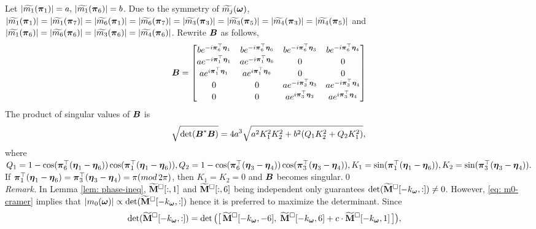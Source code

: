 Let $|\widetilde{m_1}(\boldsymbol{\pi}_1)| = a, \, |\widetilde{m_1}(\boldsymbol{\pi}_6)|=b$. Due to the symmetry of $\widetilde{m_{j}}(\boldsymbol{\omega})$,
$|\widetilde{m_1}(\boldsymbol{\pi}_1)| = |\widetilde{m_1}(\boldsymbol{\pi}_7)| = |\widetilde{m_6}(\boldsymbol{\pi}_1)| = |\widetilde{m_6}(\boldsymbol{\pi}_7)| = |\widetilde{m_3}(\boldsymbol{\pi}_3)| = |\widetilde{m_3}(\boldsymbol{\pi}_5)| = |\widetilde{m_4}(\boldsymbol{\pi}_3)| = |\widetilde{m_4}(\boldsymbol{\pi}_5)|$ and $|\widetilde{m_1}(\boldsymbol{\pi}_6)|=| \widetilde{m_6}(\boldsymbol{\pi}_6)|= | \widetilde{m_3}(\boldsymbol{\pi}_6)|=| \widetilde{m_4}(\boldsymbol{\pi}_6)|$. Rewrite $\boldsymbol{B}$ as follows,
$$\boldsymbol{B}=
\begin{bmatrix}
b e^{-i\boldsymbol{\pi}_6^\top\boldsymbol{\eta}_1} & b e^{-i\boldsymbol{\pi}_6^\top\boldsymbol{\eta}_6} & b e^{-i\boldsymbol{\pi}_6^\top\boldsymbol{\eta}_3} & b e^{-i\boldsymbol{\pi}_6^\top\boldsymbol{\eta}_4}\\
a e^{-i\boldsymbol{\pi}_1^\top\boldsymbol{\eta}_1} & a e^{-i\boldsymbol{\pi}_1^\top\boldsymbol{\eta}_6} & 0						& 0 \\
a e^{i\boldsymbol{\pi}_1^\top\boldsymbol{\eta}_1} & a e^{i\boldsymbol{\pi}_1^\top\boldsymbol{\eta}_6} & 0						& 0 \\
0 					& 0 					& a e^{-i\boldsymbol{\pi}_3^\top\boldsymbol{\eta}_3} & a e^{-i\boldsymbol{\pi}_3^\top\boldsymbol{\eta}_4}\\
0 					& 0 					& a e^{i\boldsymbol{\pi}_3^\top\boldsymbol{\eta}_3} & a e^{i\boldsymbol{\pi}_3^\top\boldsymbol{\eta}_4}\\
\end{bmatrix}
$$
The product of singular values of $\boldsymbol{B}$ is 
\begin{align}\label{eq: detB}
\sqrt{\text{det}(\boldsymbol{B}^* \boldsymbol{B})} = 4a^3\sqrt{a^2 K_1^2K_2^2 + b^2(Q_1K_2^2 + Q_2K_1^2)},
\end{align}
where $ Q_1 = 1 - \cos(\boldsymbol{\pi}_6^\top(\boldsymbol{\eta}_1-\boldsymbol{\eta}_6))\cos(\boldsymbol{\pi}_1^\top(\boldsymbol{\eta}_1-\boldsymbol{\eta}_6)), Q_2 = 1 - \cos(\boldsymbol{\pi}_6^\top(\boldsymbol{\eta}_3-\boldsymbol{\eta}_4))\cos(\boldsymbol{\pi}_3^\top(\boldsymbol{\eta}_3-\boldsymbol{\eta}_4)), K_1 = \sin(\boldsymbol{\pi}_1^\top(\boldsymbol{\eta}_1-\boldsymbol{\eta}_6)), K_2 = \sin(\boldsymbol{\pi}_3^\top(\boldsymbol{\eta}_3-\boldsymbol{\eta}_4)).$ If $\boldsymbol{\pi}_1^\top(\boldsymbol{\eta}_1-\boldsymbol{\eta}_6) = \boldsymbol{\pi}_3^\top(\boldsymbol{\eta}_3-\boldsymbol{\eta}_4) = \pi (mod\, 2\pi)$, then $K_1 = K_2 = 0$ and $\boldsymbol{B}$ becomes singular.\qed\\[.5em]
{\it Remark.} In Lemma \ref{lem: phase-ineq}, $\widetilde{\mathbf{M}}^{\Box}[:,1]$ and $\widetilde{\mathbf{M}}^{\Box}[:,6]$ being independent only guarantees $\det(\widetilde{\mathbf{M}}^{\Box}[-k_{\boldsymbol{\omega}},:])\neq 0$. However, \eqref{eq: m0-cramer} implies that $|m_0(\boldsymbol{\omega})|\propto \det(\widetilde{\mathbf{M}}^{\Box}[-k_{\boldsymbol{\omega}},:])$ hence it is preferred to maximize the determinant. Since
\begin{align*}
\det(\widetilde{\mathbf{M}}^{\Box}[-k_{\boldsymbol{\omega}}, :]) = \det\big(\big[\, \widetilde{\mathbf{M}}^{\Box}[-k_{\boldsymbol{\omega}},-6], \;\widetilde{\mathbf{M}}^{\Box}[-k_{\boldsymbol{\omega}},6] + c \cdot\widetilde{\mathbf{M}}^{\Box}[-k_{\boldsymbol{\omega}},1]  \,\big]\big),\quad 
\end{align*}
